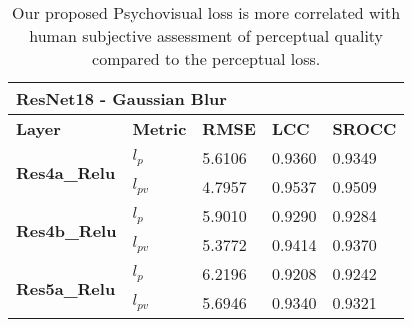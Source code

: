 \documentclass[10pt,twocolumn,letterpaper]{article}
\begin{document}
\begin{table}[]
\caption{Our proposed Psychovisual loss is more correlated with human subjective assessment of perceptual quality compared to the perceptual loss.}
\begin{tabular}{|l|l|l|l|l|}
\hline
\multicolumn{5}{|l|}{\textbf{ResNet18 - Gaussian Blur}}                                                 \\ \hline
\textbf{Layer}                        & \textbf{Metric} & \textbf{RMSE} & \textbf{LCC} & \textbf{SROCC} \\ \hline
\multirow{2}{*}{\textbf{Res4a\_Relu}} & \textbf{$l_{p}$}              & 5.6106        & 0.9360       & 0.9349         \\ \cline{2-5}
                                      & \textbf{$l_{pv}$}             & 4.7957        & 0.9537       & 0.9509         \\ \hline
\multirow{2}{*}{\textbf{Res4b\_Relu}} & \textbf{$l_{p}$}              & 5.9010        & 0.9290       & 0.9284         \\ \cline{2-5}
                                      & \textbf{$l_{pv}$}             & 5.3772        & 0.9414       & 0.9370         \\ \hline
\multirow{2}{*}{\textbf{Res5a\_Relu}} & \textbf{$l_{p}$}              & 6.2196        & 0.9208       & 0.9242         \\ \cline{2-5}
                                      & \textbf{$l_{pv}$}            & 5.6946        & 0.9340       & 0.9321         \\ \hline
\end{tabular}
\end{table}
\end{document}
